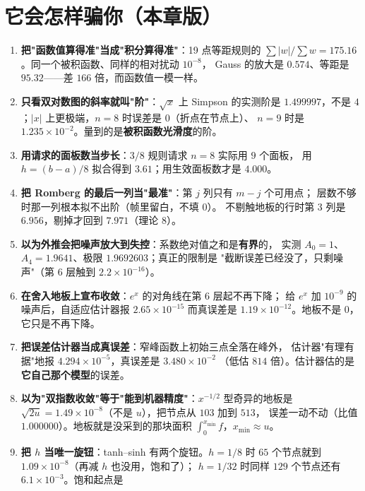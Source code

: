 \section{它会怎样骗你（本章版）}

\begin{enumerate}
  \item \textbf{把"函数值算得准"当成"积分算得准"}：19 点等距规则的
        $\sum|w|/\sum w=175.16$。同一个被积函数、同样的相对扰动 $10^{-8}$，
        Gauss 的放大是 $0.574$、等距是 $95.32$——差 $166$ 倍，而函数值一模一样。
  \item \textbf{只看双对数图的斜率就叫"阶"}：$\sqrt x$ 上 Simpson 的实测阶是
        $1.499997$，不是 $4$；$|x|$ 上更极端，$n=8$ 时误差是 $0$（折点在节点上）、
        $n=9$ 时是 $1.235\times10^{-2}$。量到的是\textbf{被积函数光滑度}的阶。
  \item \textbf{用请求的面板数当步长}：$3/8$ 规则请求 $n=8$ 实际用 $9$ 个面板，
        用 $h=(b-a)/8$ 拟合得到 $3.61$；用生效面板数才是 $4.000$。
  \item \textbf{把 Romberg 的最后一列当"最准"}：第 $j$ 列只有 $m-j$ 个可用点；
        层数不够时那一列根本拟不出阶（帧里留白，不填 $0$）。
        不剔触地板的行时第 $3$ 列是 $6.956$，剔掉才回到 $7.971$（理论 $8$）。
  \item \textbf{以为外推会把噪声放大到失控}：系数绝对值之和是\textbf{有界}的，
        实测 $A_0=1$、$A_4=1.9641$、极限 $1.9692603$；真正的限制是
        "截断误差已经没了，只剩噪声"（第 $6$ 层触到 $2.2\times10^{-16}$）。
  \item \textbf{在舍入地板上宣布收敛}：$e^x$ 的对角线在第 $6$ 层起不再下降；
        给 $e^x$ 加 $10^{-9}$ 的噪声后，自适应估计器报 $2.65\times10^{-15}$
        而真误差是 $1.19\times10^{-12}$。地板不是 $0$，它只是不再下降。
  \item \textbf{把误差估计器当成真误差}：窄峰函数上初始三点全落在峰外，
        估计器"有理有据"地报 $4.294\times10^{-5}$，真误差是 $3.480\times10^{-2}$
        （低估 $814$ 倍）。估计器估的是\textbf{它自己那个模型}的误差。
  \item \textbf{以为"双指数收敛"等于"能到机器精度"}：$x^{-1/2}$ 型奇异的地板是
        $\sqrt{2u}=1.49\times10^{-8}$（不是 $u$），把节点从 $103$ 加到 $513$，
        误差一动不动（比值 $1.000000$）。地板就是没采到的那块面积
        $\int_0^{x_{\min}}f$，$x_{\min}\approx u$。
  \item \textbf{把 $h$ 当唯一旋钮}：tanh–sinh 有两个旋钮。$h=1/8$ 时
        $65$ 个节点就到 $1.09\times10^{-8}$（再减 $h$ 也没用，饱和了）；
        $h=1/32$ 时同样 $129$ 个节点还有 $6.1\times10^{-3}$。饱和起点是

\end{enumerate}

